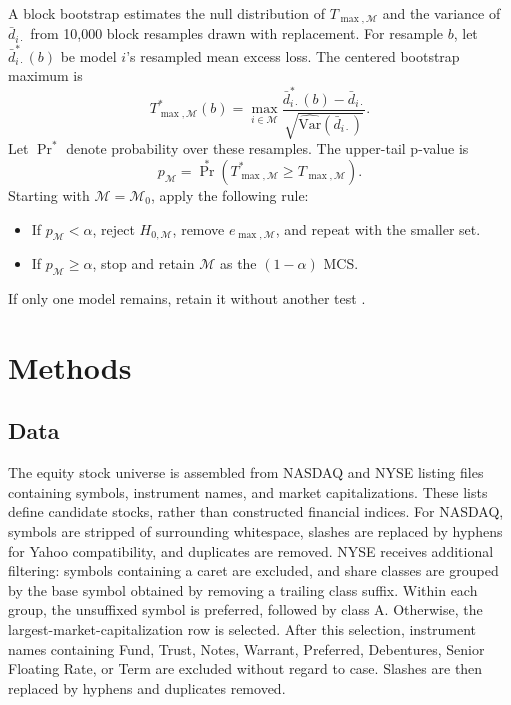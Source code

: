 \documentclass[12pt,a4paper]{article}
\numberwithin{equation}{section}
\numberwithin{table}{section}
\numberwithin{figure}{section}
\begin{document}
\begin{samepage}
A block bootstrap estimates the null distribution of $T_{\max,\mathcal M}$ and the variance of $\bar d_{i\cdot}$ from 10,000 block resamples drawn with replacement. For resample $b$, let $\bar d^*_{i\cdot}(b)$ be model $i$'s resampled mean excess loss. The centered bootstrap maximum is
\begin{equation}\label{eq:mcs-bootstrap-max}
T^*_{\max,\mathcal M}(b)=\max_{i\in\mathcal M}
\frac{\bar d^*_{i\cdot}(b)-\bar d_{i\cdot}}
{\sqrt{\widehat{\mathrm{Var}}(\bar d_{i\cdot})}}.
\end{equation}
Let $\Pr^*$ denote probability over these resamples. The upper-tail p-value is
\begin{equation}\label{eq:mcs-bootstrap-p-value}
p_{\mathcal M}=\Pr^*\!\left(T^*_{\max,\mathcal M}\geq T_{\max,\mathcal M}\right).
\end{equation}
Starting with $\mathcal M=\mathcal M_0$, apply the following rule:
\begin{itemize}
    \item If $p_{\mathcal M}<\alpha$, reject $H_{0,\mathcal M}$, remove $e_{\max,\mathcal M}$, and repeat with the smaller set.
    \item If $p_{\mathcal M}\geq\alpha$, stop and retain $\mathcal M$ as the $(1-\alpha)$ MCS.
\end{itemize}
If only one model remains, retain it without another test \cite{hansen2011mcs}.
\end{samepage}

\section{Methods}
\subsection{Data}
The equity stock universe is assembled from NASDAQ and NYSE listing files containing symbols, instrument names, and market capitalizations. These lists define candidate stocks, rather than constructed financial indices. For NASDAQ, symbols are stripped of surrounding whitespace, slashes are replaced by hyphens for Yahoo compatibility, and duplicates are removed. NYSE receives additional filtering: symbols containing a caret are excluded, and share classes are grouped by the base symbol obtained by removing a trailing class suffix. Within each group, the unsuffixed symbol is preferred, followed by class A. Otherwise, the largest-market-capitalization row is selected. After this selection, instrument names containing Fund, Trust, Notes, Warrant, Preferred, Debentures, Senior Floating Rate, or Term are excluded without regard to case. Slashes are then replaced by hyphens and duplicates removed. 
\end{document}
